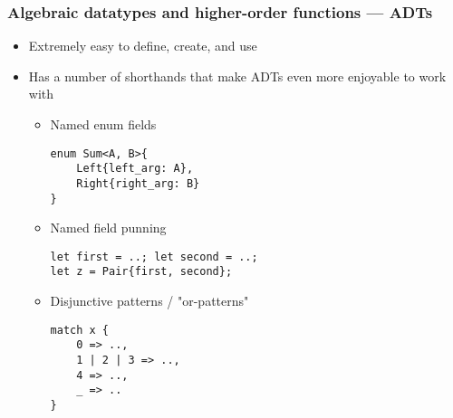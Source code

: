 \documentclass[t]{beamer}
\begin{document}
\begin{frame}[fragile]
\frametitle{Algebraic datatypes and higher-order functions --- ADTs}

\begin{itemize}
\item Extremely easy to define, create, and use
\item Has a number of shorthands that make ADTs even more enjoyable to work with
\begin{itemize}
\medskip
{}\item Named enum fields
\begin{verbatim}
enum Sum<A, B>{
    Left{left_arg: A},
    Right{right_arg: B}
}
\end{verbatim}
\medskip
{}\item Named field punning
\begin{verbatim}
let first = ..; let second = ..;
let z = Pair{first, second};
\end{verbatim}
\medskip
{}\item Disjunctive patterns / "or-patterns"
\begin{verbatim}
match x {
    0 => ..,
    1 | 2 | 3 => ..,
    4 => ..,
    _ => ..
}
\end{verbatim}
\end{itemize}
\end{itemize}

\end{frame}
\end{document}
